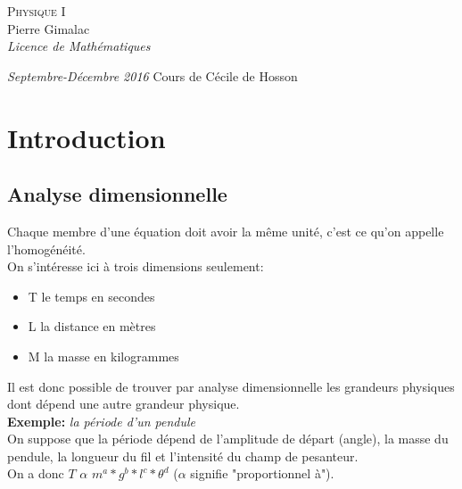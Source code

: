 \documentclass[a4paper,10pt]{book}
\begin{document}
\begin{titlepage}
\thispagestyle{empty}
\begin{center}
\vspace*{7cm}
\Huge \textsc{Physique I}\\
\vspace{1.5cm}
\Large Pierre Gimalac\\
\vspace{0.5cm}
\large \textit{Licence de Mathématiques}
\vfill
\end{center}
\large \textit{Septembre-Décembre 2016}
\hfill 
\large Cours de Cécile de Hosson
\restoregeometry
\end{titlepage}

\renewcommand{\contentsname}{Sommaire}
\thispagestyle{empty}
\tableofcontents \thispagestyle{empty}

\chapter*{Introduction}
\section*{Analyse dimensionnelle}

Chaque membre d'une équation doit avoir la même unité, c'est ce qu'on appelle l'homogénéité.\\

On s’intéresse ici à trois dimensions seulement:
\begin{itemize}
\item T le temps en secondes
\item L la distance en mètres
\item M la masse en kilogrammes\\
\end{itemize}

Il est donc possible de trouver par analyse dimensionnelle les grandeurs physiques dont dépend une autre grandeur physique.\\

\textbf{Exemple:} \emph{la période d'un pendule}\\

On suppose que la période dépend de l'amplitude de départ (angle), la masse du pendule, la longueur du fil et l'intensité du champ de pesanteur.\\

On a donc $T$ $\alpha$ $m^{a}*g^{b}*l^{c}*\theta^{d}$ ($\alpha$ signifie "proportionnel à").\\
\end{document}
